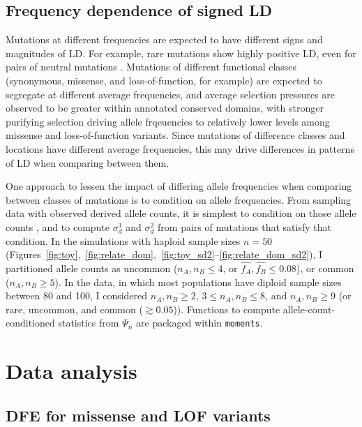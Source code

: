 \documentclass[]{article}
\begin{document}
\subsection{Frequency dependence of signed LD}

Mutations at different frequencies are expected to have different signs and
magnitudes of LD. For example, rare mutations show highly positive LD, even for
pairs of neutral mutations \citep{Good2022-ot}. Mutations of different
functional classes (synonymous, missense, and loss-of-function, for example)
are expected to segregate at different average frequencies, and average
selection pressures are observed to be greater within annotated conserved
domains, with stronger purifying selection driving allele frqeuencies to
relatively lower levels among missense and loss-of-function variants. Since
mutations of difference classes and locations have different average
frequencies, this may drive differences in patterns of LD when comparing
between them.

One approach to lessen the impact of differing allele frequencies when
comparing between classes of mutations is to condition on allele frequencies.
From sampling data with observed derived allele counts, it is simplest to
condition on those allele counts \citep[e.g.,\(n_A,n_B=2\),][]{Garcia2021-zn},
and to compute \(\sigma_d^1\) and \(\sigma_d^2\) from pairs of mutations that
satisfy that condition. In the simulations with haploid sample sizes \(n=50\)
(Figures~\ref{fig:toy},~\ref{fig:relate_dom},~\ref{fig:toy_sd2}--\ref{fig:relate_dom_sd2}),
I partitioned allele counts as uncommon (\(n_A, n_B \leq 4\), or \(\hat{f_A},
\hat{f_B} \leq 0.08\)), or common (\(n_A, n_B \geq 5\)). In the
\citet{1000_Genomes_Project_Consortium2015-zq} data, in which most populations
have diploid sample sizes between 80 and 100, I considered \(n_A, n_B \geq 2\),
\(3\leq n_A, n_B \leq 8\), and \(n_A, n_B \geq 9\) (or rare, uncommon, and
common (\(\gtrsim 0.05\))). Functions to compute allele-count-conditioned
statistics from \(\Psi_n\) are packaged within \texttt{moments}.

\section{Data analysis}

\subsection{DFE for missense and LOF variants}
\end{document}
